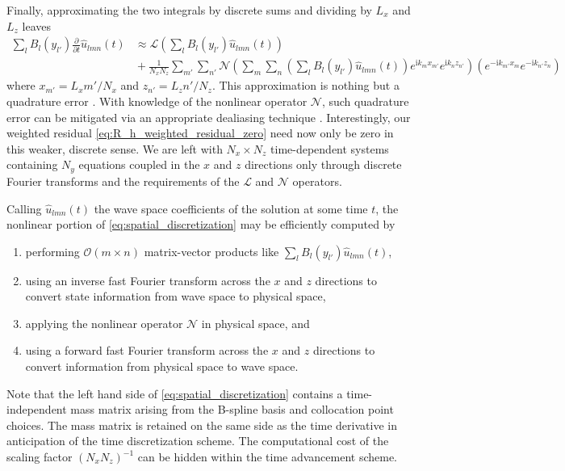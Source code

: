 \documentclass[letterpaper,11pt,nointlimits,reqno,draft]{amsbook}
\newcommand{\ii}{\ensuremath{\mathrm{i}}}
\begin{document}
Finally, approximating the two integrals by discrete sums and dividing
by $L_x$ and $L_z$ leaves
\begin{align}
  \sum_{l} B_l\!\left(y_{l'}\right)
  \frac{\partial}{\partial{}t} \hat{u}_{l m n}(t)
  &\approx
  \mathscr{L}\left(
    \sum_{l}
     B_l\!\left(y_{l'}\right)
    \hat{u}_{l m n}(t)
  \right)
\\
  &{}+
  \frac{1}{N_x N_z}
  \sum_{m'} \sum_{n'}
  \mathscr{N}\left(
    \sum_{m}
    \sum_{n}
    \left(
      \sum_{l} B_l\!\left(y_{l'}\right)
      \hat{u}_{l m n}(t)
    \right)
    e^{\ii k_m x_{m'}}e^{\ii k_n z_{n'}}
  \right)
  \!\!
  \left(
    e^{-\ii k_{m'} x_m}e^{-\ii k_{n'} z_n}
  \right)
  \label{eq:spatial_discretization}
\end{align}
where $x_{m'}=L_x m' / N_x$ and $z_{n'}=L_z n' / N_z$.  This approximation is
nothing but a quadrature error \citep[see][theorem~19]{Boyd2001}.  With
knowledge of the nonlinear operator $\mathscr{N}$, such quadrature error can be
mitigated via an appropriate dealiasing technique \citep[see][]{Canuto2006}.
Interestingly, our weighted residual \eqref{eq:R_h_weighted_residual_zero} need
now only be zero in this weaker, discrete sense.  We are left with
$N_x\times{}N_z$ time-dependent systems containing $N_y$ equations coupled in
the $x$ and $z$ directions only through discrete Fourier transforms and the
requirements of the $\mathscr{L}$ and $\mathscr{N}$ operators.

Calling $\hat{u}_{l m n}(t)$ the wave space coefficients of the solution at
some time $t$, the nonlinear portion of \eqref{eq:spatial_discretization} may
be efficiently computed by
\begin{enumerate}
 \item performing $\mathcal{O}\!\left(m\times{}n\right)$ matrix-vector products
       like $\sum_{l} B_l\!\left(y_{l'}\right) \hat{u}_{l m n}(t)$,
 \item using an inverse fast Fourier transform across
       the $x$ and $z$ directions to convert state information from wave space
       to physical space,
 \item applying the nonlinear operator $\mathscr{N}$ in physical space, and
 \item using a forward fast Fourier transform across the $x$ and $z$
       directions to convert information from physical space to wave space.
\end{enumerate}
Note that the left hand side of \eqref{eq:spatial_discretization} contains a
time-independent mass matrix arising from the B-spline basis and collocation
point choices.  The mass matrix is retained on the same side as the time
derivative in anticipation of the time discretization scheme.  The
computational cost of the scaling factor $\left(N_x N_z\right)^{-1}$
can be hidden within the time advancement scheme.
\end{document}
